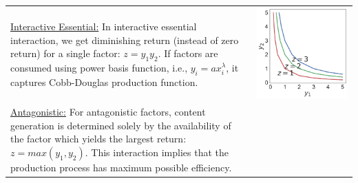 \begin{table}[h!]
\begin{tabular}{m{}c}
    \vspace{-5pt}
    \uline{Interactive Essential:} In interactive essential interaction, we get diminishing return (instead of zero return) for a single factor: $z = y_1y_2$. If factors are consumed using power basis function, i.e., $y_i = ax^\lambda_i$, it captures Cobb-Douglas production function.
    &
    \begin{minipage}{.17\textwidth}
      \includegraphics[width=\textwidth, height=.975\textwidth]{Figures/Interactive_Essential.pdf}
    \end{minipage}
    \\
    \vspace{-5pt}
    \uline{Antagonistic:} For antagonistic factors, content generation is determined solely by the availability of the factor which yields the largest return: $z = max(y_1, y_2)$. This interaction implies that the production process has maximum possible efficiency. 
    &
    \begin{minipage}{.17\textwidth}

\end{minipage}
\end{tabular}
\end{table}
